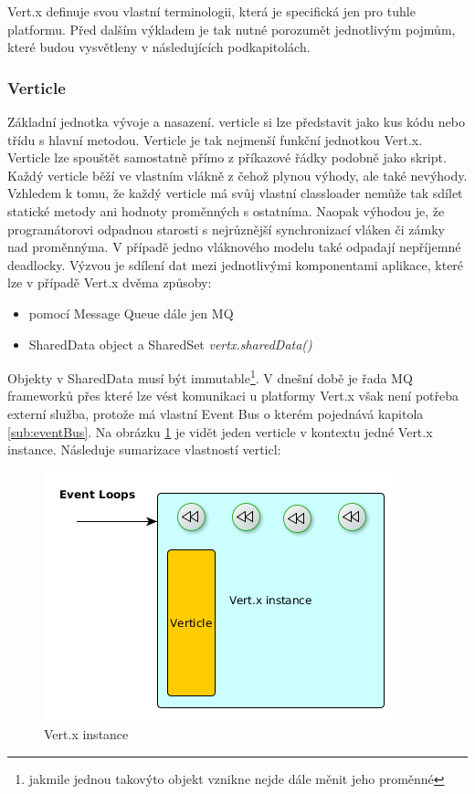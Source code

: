 Vert.x definuje svou vlastní terminologii, která je specifická jen pro tuhle platformu. Před dalším výkladem je tak nutné porozumět jednotlivým pojmům, které budou vysvětleny v následujících podkapitolách.

\subsubsection{Verticle}\label{sub:verticle}

Základní jednotka vývoje a nasazení. verticle si lze představit jako kus kódu nebo třídu s hlavní metodou. Verticle je tak nejmenší funkční jednotkou Vert.x. Verticle lze spouštět samostatně přímo z příkazové řádky podobně jako skript. Každý verticle běží ve vlastním vlákně z čehož plynou výhody, ale také nevýhody. Vzhledem k tomu, že každý verticle má svůj vlastní classloader nemůže tak sdílet statické metody ani hodnoty proměnných s ostatníma. Naopak výhodou je, že programátorovi odpadnou starosti s nejrůznější synchronizací vláken či zámky nad proměnnýma. V případě jedno vláknového modelu také odpadají nepříjemné deadlocky. Výzvou je sdílení dat mezi jednotlivými komponentami aplikace, které lze v případě Vert.x dvěma způsoby:
\begin{itemize}
\item{pomocí Message Queue\cite{mq} dále jen MQ}
\item{SharedData object a SharedSet \emph{vertx.sharedData()}}
\end{itemize}
Objekty v SharedData musí být immutable\footnote{jakmile jednou takovýto objekt vznikne nejde dále měnit jeho proměnné}. V dnešní době je řada MQ frameworků přes které lze vést komunikaci u platformy Vert.x však není potřeba externí služba, protože má vlastní Event Bus o kterém pojednává kapitola \ref{sub:eventBus}. Na obrázku \ref{fig:instance} je vidět jeden verticle v kontextu jedné Vert.x instance. Následuje sumarizace vlastností verticl:
\begin{figure}
\begin{centering}
\includegraphics[scale=0.5]{obrazky/instance}
\par\end{centering}
\caption{Vert.x instance \label{fig:instance}}
\end{figure}


